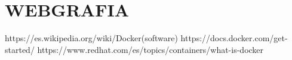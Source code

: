 \documentclass[preprint,12pt]{elsarticle}
\begin{document}
\section{WEBGRAFIA}
https://es.wikipedia.org/wiki/Docker(software)\newline
https://docs.docker.com/get-started/\newline
https://www.redhat.com/es/topics/containers/what-is-docker\newline
\end{document}
